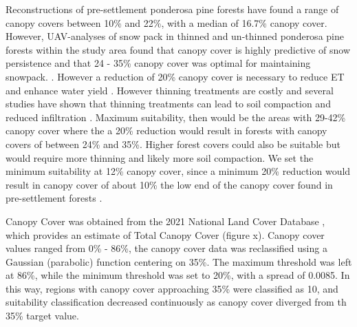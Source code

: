 \documentclass[
  number,
  preprint,
  3p,
  onecolumn]{elsarticle}
\begin{document}
Reconstructions of pre-settlement ponderosa pine forests have found a
range of canopy covers between 10\% and 22\%, with a median of 16.7\%
canopy cover\citep{huffman2012}. However, UAV-analyses of snow pack in
thinned and un-thinned ponderosa pine forests within the study area
found that canopy cover is highly predictive of snow persistence and
that 24 - 35\% canopy cover was optimal for maintaining snowpack.
\citep{donager2021, sankey_multi-scale_2015, belmonte_uav-based_2021}.
However a reduction of 20\% canopy cover is necessary to reduce ET and
enhance water yield \citep{adams_ecohydrological_2012} . However
thinning treatments are costly and several studies have shown that
thinning treatments can lead to soil compaction and reduced infiltration
\citep{moreno2016}. Maximum suitability, then would be the areas with
29-42\% canopy cover where the a 20\% reduction would result in forests
with canopy covers of between 24\% and 35\%. Higher forest covers could
also be suitable but would require more thinning and likely more soil
compaction. We set the minimum suitability at 12\% canopy cover, since a
minimum 20\% reduction would result in canopy cover of about 10\% the
low end of the canopy cover found in pre-settlement forests
\citep{huffman2012}.

Canopy Cover was obtained from the 2021 National Land Cover Database ,
which provides an estimate of Total Canopy Cover (figure x). Canopy
cover values ranged from 0\% - 86\%, the canopy cover data was
reclassified using a Gaussian (parabolic) function centering on 35\%.
The maximum threshold was left at 86\%, while the minimum threshold was
set to 20\%, with a spread of 0.0085. In this way, regions with canopy
cover approaching 35\% were classified as 10, and suitability
classification decreased continuously as canopy cover diverged from th
35\% target value.
\end{document}
